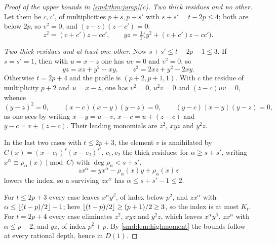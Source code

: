 \begin{proof}[Proof of the upper bounds in \cref{smd:thm:jump}(c)]
\emph{Two thick residues and no other.} Let them be $c,c'$, of multiplicities $p+s,p+s'$ with
$s+s'=t-2p\le4$; both are below $2p$, so $v^2=0$, and $(z-c)(z-c')=0$:
\[
 z^2=(c+c')z-cc',\qquad yz=\tfrac12\bigl(y^2+(c+c')z-cc'\bigr).
\]

\emph{Two thick residues and at least one other.} Now $s+s'\le t-2p-1\le3$. If $s=s'=1$, then
with $u=x-z$ one has $uv=0$ and $v^2=0$, so
\[
 yz=xz+y^2-xy,\qquad z^2=2xz+y^2-2xy .
\]
Otherwise $t=2p+4$ and the profile is $(p+2,p+1,1)$. With $c$ the residue of multiplicity $p+2$
and $u=x-z$, one has $v^2=0$, $u^2v=0$ and $(z-c)uv=0$, whence
\[
 (y-z)^2=0,\qquad (x-c)(x-y)(y-z)=0,\qquad (y-c)(x-y)(y-z)=0,
\]
as one sees by writing $x-y=u-v$, $x-c=u+(z-c)$ and $y-c=v+(z-c)$. Their leading monomials are
$z^2$, $xyz$ and $y^2z$.

In the last two cases with $t\le2p+3$, the element $v$ is annihilated by
$C(x)=(x-c_1)^{s}(x-c_2)^{s'}$, $c_1,c_2$ the thick residues; for $\alpha\ge s+s'$, writing
$x^\alpha\equiv\rho_\alpha(x)\pmod{C}$ with $\deg\rho_\alpha<s+s'$,
\[
 zx^\alpha=yx^\alpha-\rho_\alpha(x)y+\rho_\alpha(x)z
\]
lowers the index, so a surviving $zx^\alpha$ has $\alpha\le s+s'-1\le2$.

For $t\le2p+3$ every case leaves $x^\alpha y^\beta$, of index below $p^2$, and $zx^\alpha$ with
$\alpha\le\lfloor(t-p)/2\rfloor-1$; here $\lfloor(t-p)/2\rfloor\ge(p+1)/2\ge3$, so the index is at most
$K_t$. For $t=2p+4$ every case eliminates $z^2$, $xyz$ and $y^2z$, which leaves $x^\alpha y^\beta$,
$zx^\alpha$ with $\alpha\le p-2$, and $yz$, of index $p^2+p$. By \cref{smd:lem:highmoment} the
bounds follow at every rational depth, hence in $D(1)$.
\end{proof}

